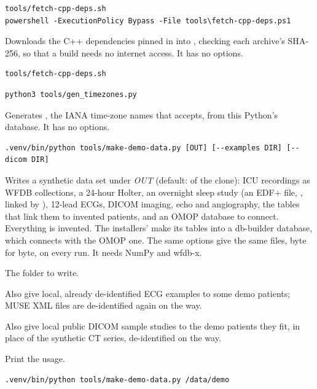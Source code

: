 \begin{lstlisting}[style=signature]
tools/fetch-cpp-deps.sh
powershell -ExecutionPolicy Bypass -File tools\fetch-cpp-deps.ps1
\end{lstlisting}
Downloads the C++ dependencies pinned in  into
, checking each archive's SHA-256, so that a build needs no
internet access. It has no options.
\begin{lstlisting}[style=shell]
tools/fetch-cpp-deps.sh
\end{lstlisting}

\begin{lstlisting}[style=signature]
python3 tools/gen_timezones.py
\end{lstlisting}
Generates , the IANA time-zone names
that  accepts, from this Python's  database. It has no
options.

\begin{lstlisting}[style=signature]
.venv/bin/python tools/make-demo-data.py [OUT] [--examples DIR] [--dicom DIR]
\end{lstlisting}
Writes a synthetic data set under \textit{OUT} (default:  of the clone):
ICU recordings as WFDB collections, a 24-hour Holter, an overnight sleep study (an EDF+ file,
, linked by ), 12-lead ECGs, DICOM
imaging, echo and angiography, the tables that link them to invented patients, and an OMOP
database to connect. Everything is invented. The installers'  make its tables into a
db-builder database, which  connects with the OMOP one. The same options give the same files, byte for
byte, on every run. It needs NumPy and wfdb-x.
\begin{params}
\item[OUT] The folder to write.
\item[--examples DIR] Also give local, already de-identified ECG examples to some demo patients;
  MUSE XML files are de-identified again on the way.
\item[--dicom DIR] Also give local public DICOM sample studies to the demo patients they fit, in
  place of the synthetic CT series, de-identified on the way.
\item[-h, --help] Print the usage.
\end{params}
\begin{lstlisting}[style=shell]
.venv/bin/python tools/make-demo-data.py /data/demo
\end{lstlisting}

